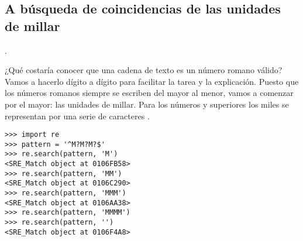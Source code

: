 \subsection{A búsqueda de coincidencias de las unidades de millar}.

¿Qué costaría conocer que una cadena de texto es un número romano válido? Vamos a hacerlo dígito a dígito para facilitar la tarea y la explicación. Puesto que los números romanos siempre se escriben del mayor al menor, vamos a comenzar por el mayor: las unidades de millar. Para los números  y superiores los miles se representan por una serie de caracteres .

\noindent\begin{minipage}{\textwidth}
\begin{lstlisting}[mathescape=False]
>>> import re
>>> pattern = '^M?M?M?$'
>>> re.search(pattern, 'M')
<SRE_Match object at 0106FB58>
>>> re.search(pattern, 'MM')
<SRE_Match object at 0106C290>
>>> re.search(pattern, 'MMM')
<SRE_Match object at 0106AA38>
>>> re.search(pattern, 'MMMM')
>>> re.search(pattern, '')
<SRE_Match object at 0106F4A8>
\end{lstlisting}
\end{minipage}

